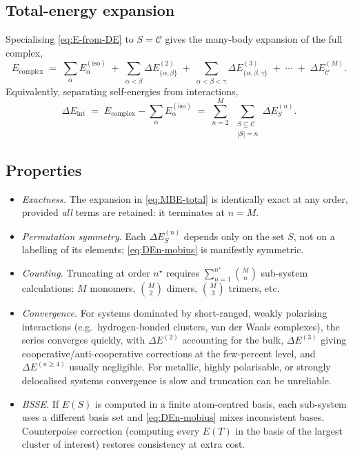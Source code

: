 \documentclass[11pt,a4paper]{article}
\newcommand{\Eint}{\Delta E_{\mathrm{int}}}
\newcommand{\Eiso}{E^{(\mathrm{iso})}}
\newcommand{\Ecpl}{E_{\mathrm{complex}}}
\begin{document}
\subsection{Total-energy expansion}

Specialising \cref{eq:E-from-DE} to $S = \mathcal{C}$ gives the many-body
expansion of the full complex,
\begin{equation}
\boxed{\;
\Ecpl
\;=\; \sum_{\alpha} \Eiso_\alpha
\;+\; \sum_{\alpha<\beta} \Delta E^{(2)}_{\{\alpha,\beta\}}
\;+\; \sum_{\alpha<\beta<\gamma} \Delta E^{(3)}_{\{\alpha,\beta,\gamma\}}
\;+\; \cdots
\;+\; \Delta E^{(M)}_{\mathcal{C}}.
\;}
\label{eq:MBE-total}
\end{equation}
Equivalently, separating self-energies from interactions,
\begin{equation}
\Eint
\;=\; \Ecpl - \sum_{\alpha} \Eiso_\alpha
\;=\; \sum_{n=2}^{M} \;\sum_{\substack{S \subseteq \mathcal{C} \\ |S|=n}}
        \Delta E^{(n)}_{S}.
\label{eq:Eint-MBE}
\end{equation}

\subsection{Properties}

\begin{itemize}[leftmargin=1.4em]
\item \emph{Exactness.} The expansion in \cref{eq:MBE-total} is identically
exact at any order, provided \emph{all} terms are retained: it terminates at
$n = M$.
\item \emph{Permutation symmetry.} Each $\Delta E^{(n)}_{S}$ depends only on the
set $S$, not on a labelling of its elements; \cref{eq:DEn-mobius} is manifestly
symmetric.
\item \emph{Counting.} Truncating at order $n^\star$ requires
$\sum_{n=1}^{n^\star} \binom{M}{n}$ sub-system calculations:
$M$ monomers, $\binom{M}{2}$ dimers, $\binom{M}{3}$ trimers, etc.
\item \emph{Convergence.} For systems dominated by short-ranged, weakly
polarising interactions (e.g.\ hydrogen-bonded clusters, van der Waals
complexes), the series converges quickly, with $\Delta E^{(2)}$ accounting for
the bulk, $\Delta E^{(3)}$ giving cooperative/anti-cooperative corrections at
the few-percent level, and $\Delta E^{(n \ge 4)}$ usually negligible. For
metallic, highly polarisable, or strongly delocalised systems convergence is
slow and truncation can be unreliable.
\item \emph{BSSE.} If $E(S)$ is computed in a finite atom-centred basis, each
sub-system uses a different basis set and \cref{eq:DEn-mobius} mixes
inconsistent bases. Counterpoise correction (computing every $E(T)$ in the
basis of the largest cluster of interest) restores consistency at extra cost.
\end{itemize}
\end{document}
